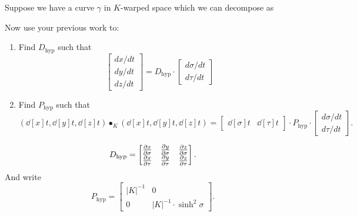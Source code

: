 \documentclass[handout,newpage,hints,,12pt,noauthor,nooutcomes]{ximera}
\begin{document}
\begin{problem}
  Suppose we have a curve $\gamma$ in $K$-warped space which we can decompose as
    \begin{center}
    \end{center}
    Now use your previous work to:
    \begin{enumerate}
    \item Find $D_{\mathrm{hyp}}$ such
      that
      \[
      \begin{bmatrix}
        dx/dt\\ dy/dt \\ dz/dt
      \end{bmatrix}
      = D_{\mathrm{hyp}} \cdot
      \begin{bmatrix}
        d\sigma/dt \\ d\tau/dt
      \end{bmatrix}
      \]
    \item Find $P_\mathrm{hyp}$ such that
      \[
      \left(\dd[x]{t}, \dd[y]{t}, \dd[z]{t}\right)\bullet_K
      \left(\dd[x]{t}, \dd[y]{t}, \dd[z]{t}\right)
      =
      \begin{bmatrix}
        \dd[\sigma]{t} &  \dd[\tau]{t}
      \end{bmatrix}
      \cdot P_\mathrm{hyp}
      \cdot
      \begin{bmatrix}
        d\sigma/dt \\  d\tau/dt
      \end{bmatrix}.
      \]
    \end{enumerate}
    
\begin{freeResponse}
  \[
  D_{\mathrm{hyp}} =
  \begin{bmatrix}
    \pp[x]{\sigma} & \pp[y]{\sigma} & \pp[z]{\sigma} \\
    \pp[x]{\tau}   & \pp[y]{\tau}   & \pp[z]{\tau}
  \end{bmatrix}.
  \]
  And write
     \[
     P_\mathrm{hyp} =
  \begin{bmatrix}
    |K|^{-1} & 0 \\
    0 & |K|^{-1}\cdot\sinh^2 \sigma
  \end{bmatrix}.
  \]
  \end{freeResponse}
\end{problem}
\end{document}
